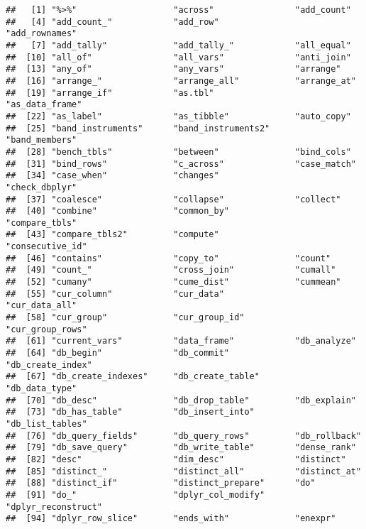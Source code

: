 \documentclass[
]{book}
\begin{document}
\begin{verbatim}
##   [1] "%>%"                   "across"                "add_count"            
##   [4] "add_count_"            "add_row"               "add_rownames"         
##   [7] "add_tally"             "add_tally_"            "all_equal"            
##  [10] "all_of"                "all_vars"              "anti_join"            
##  [13] "any_of"                "any_vars"              "arrange"              
##  [16] "arrange_"              "arrange_all"           "arrange_at"           
##  [19] "arrange_if"            "as.tbl"                "as_data_frame"        
##  [22] "as_label"              "as_tibble"             "auto_copy"            
##  [25] "band_instruments"      "band_instruments2"     "band_members"         
##  [28] "bench_tbls"            "between"               "bind_cols"            
##  [31] "bind_rows"             "c_across"              "case_match"           
##  [34] "case_when"             "changes"               "check_dbplyr"         
##  [37] "coalesce"              "collapse"              "collect"              
##  [40] "combine"               "common_by"             "compare_tbls"         
##  [43] "compare_tbls2"         "compute"               "consecutive_id"       
##  [46] "contains"              "copy_to"               "count"                
##  [49] "count_"                "cross_join"            "cumall"               
##  [52] "cumany"                "cume_dist"             "cummean"              
##  [55] "cur_column"            "cur_data"              "cur_data_all"         
##  [58] "cur_group"             "cur_group_id"          "cur_group_rows"       
##  [61] "current_vars"          "data_frame"            "db_analyze"           
##  [64] "db_begin"              "db_commit"             "db_create_index"      
##  [67] "db_create_indexes"     "db_create_table"       "db_data_type"         
##  [70] "db_desc"               "db_drop_table"         "db_explain"           
##  [73] "db_has_table"          "db_insert_into"        "db_list_tables"       
##  [76] "db_query_fields"       "db_query_rows"         "db_rollback"          
##  [79] "db_save_query"         "db_write_table"        "dense_rank"           
##  [82] "desc"                  "dim_desc"              "distinct"             
##  [85] "distinct_"             "distinct_all"          "distinct_at"          
##  [88] "distinct_if"           "distinct_prepare"      "do"                   
##  [91] "do_"                   "dplyr_col_modify"      "dplyr_reconstruct"    
##  [94] "dplyr_row_slice"       "ends_with"             "enexpr"               

\end{verbatim}
\end{document}
